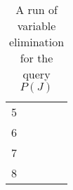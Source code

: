 \documentclass[12pt,a4paper]{article}
\begin{document}
\begin{table}[!h]
\begin{tabular}{c|l|l|l|l}
5    &                                                                                    &                                                                             &                                                                                   &                                                                          \\
6    &                                                                                    &                                                                             &                                                                                   &                                                                          \\
7    &                                                                                    &                                                                             &                                                                                   &                                                                          \\
8    &                                                                                    &                                                                             &                                                                                   &
\end{tabular}
\caption{A run of variable elimination for the query $P(J)$}
\label{table:VE}
\end{table}



\end{document}
